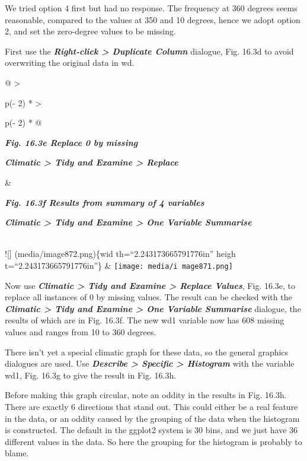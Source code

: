 \documentclass[
  letterpaper,
  DIV=11,
  numbers=noendperiod]{scrreprt}
\begin{document}
We tried option 4 first but had no response. The frequency at 360
degrees seems reasonable, compared to the values at 350 and 10 degrees,
hence we adopt option 2, and set the zero-degree values to be missing.

First use the \textbf{\emph{Right-click \textgreater{} Duplicate
Column}} dialogue, Fig. 16.3d to avoid overwriting the original data in
wd.

\begin{longtable}[]{@{}
  >{\raggedright\arraybackslash}p{(\columnwidth - 2\tabcolsep) * }
  >{\raggedright\arraybackslash}p{(\columnwidth - 2\tabcolsep) * }@{}}
\toprule\noalign{}
\begin{minipage}[b]{\linewidth}\raggedright
\textbf{\emph{Fig. 16.3e Replace 0 by missing}}

\textbf{\emph{Climatic \textgreater{} Tidy and Examine \textgreater{}
Replace}}
\end{minipage} & \begin{minipage}[b]{\linewidth}\raggedright
\textbf{\emph{Fig. 16.3f Results from summary of 4 variables}}

\textbf{\emph{Climatic \textgreater{} Tidy and Examine \textgreater{}
One Variable Summarise}}
\end{minipage} \\
\midrule\noalign{}
\endhead
\bottomrule\noalign{}
\endlastfoot
!{[}{]} (media/image872.png)\{wid th=``2.243173665791776in'' heigh
t=``2.243173665791776in''\} &
\texttt{[image: media/i mage871.png]} \\
\end{longtable}

Now use \textbf{\emph{Climatic \textgreater{} Tidy and Examine
\textgreater{} Replace Values}}, Fig. 16.3e, to replace all instances of
0 by missing values. The result can be checked with the
\textbf{\emph{Climatic \textgreater{} Tidy and Examine \textgreater{}
One Variable Summarise}} dialogue, the results of which are in Fig.
16.3f. The new wd1 variable now has 608 missing values and ranges from
10 to 360 degrees.

There isn't yet a special climatic graph for these data, so the general
graphics dialogues are used. Use \textbf{\emph{Describe \textgreater{}
Specific \textgreater{} Histogram}} with the variable wd1, Fig. 16.3g to
give the result in Fig. 16.3h.

Before making this graph circular, note an oddity in the results in Fig.
16.3h. There are exactly 6 directions that stand out. This could either
be a real feature in the data, or an oddity caused by the grouping of
the data when the histogram is constructed. The default in the ggplot2
system is 30 bins, and we just have 36 different values in the data. So
here the grouping for the histogram is probably to blame.
\end{document}
